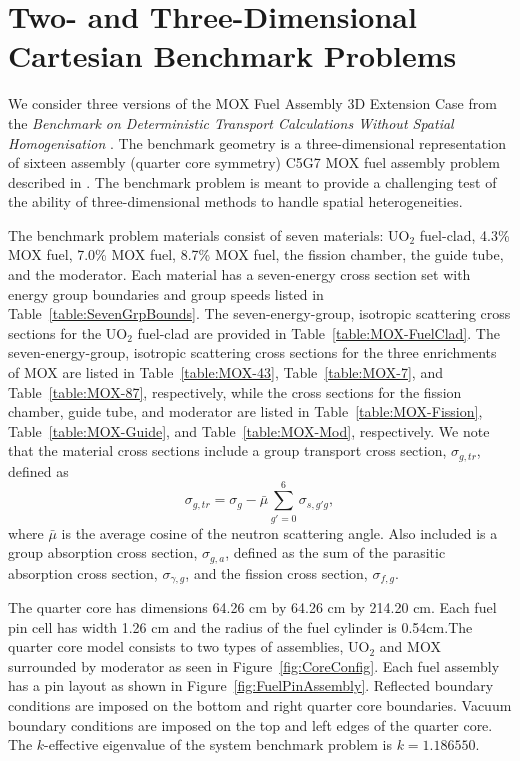 \clearpage

\section{Two- and Three-Dimensional Cartesian Benchmark Problems}

We consider three versions of the MOX Fuel Assembly 3D Extension Case from the \textit{Benchmark on Deterministic Transport Calculations Without Spatial Homogenisation} \cite{lewis2001benchmark}. The benchmark geometry is a three-dimensional representation of sixteen assembly (quarter core symmetry) C5G7 MOX fuel assembly problem described in \cite{cavarec1994oecd}. The benchmark problem is meant to provide a challenging test of the ability of three-dimensional methods to handle spatial heterogeneities. 

The benchmark problem materials consist of seven materials: UO$_{2}$ fuel-clad, 4.3\% MOX fuel, 7.0\% MOX fuel, 8.7\% MOX fuel, the fission chamber, the guide tube, and the moderator. Each material has a seven-energy cross section set with energy group boundaries and group speeds listed in Table~\ref{table:SevenGrpBounds}. The seven-energy-group, isotropic scattering cross sections for the UO$_{2}$ fuel-clad are provided in Table~\ref{table:MOX-FuelClad}. The seven-energy-group, isotropic scattering cross sections for the three enrichments of MOX are listed in Table~\ref{table:MOX-43}, Table~\ref{table:MOX-7}, and Table~\ref{table:MOX-87}, respectively, while the cross sections for the fission chamber, guide tube, and moderator are listed in Table~\ref{table:MOX-Fission}, Table~\ref{table:MOX-Guide}, and Table~\ref{table:MOX-Mod}, respectively. We note that the material cross sections include a group transport cross section, $\sigma_{g,tr}$, defined as
\begin{equation}
	\sigma_{g,tr} = \sigma_{g} - \bar{\mu} \sum_{g'=0}^{6} \sigma_{s,g'g},
\end{equation}
where $\bar{\mu}$ is the average cosine of the neutron scattering angle. Also included is a group absorption cross section, $\sigma_{g,a}$, defined as the sum of the parasitic absorption cross section, $\sigma_{\gamma,g}$, and the fission cross section, $\sigma_{f,g}$.

The quarter core has dimensions 64.26 cm by 64.26 cm by 214.20 cm. Each fuel pin cell has width 1.26 cm and the radius of the fuel cylinder is 0.54cm.The quarter core model consists to two types of assemblies, UO$_{2}$ and MOX surrounded by moderator as seen in Figure~\ref{fig:CoreConfig}. Each fuel assembly has a pin layout as shown in Figure~\ref{fig:FuelPinAssembly}. Reflected boundary conditions are imposed on the bottom and right quarter core boundaries. Vacuum boundary conditions are imposed on the top and left edges of the quarter core. The $k$-effective eigenvalue of the system benchmark problem is $k = 1.186550$.

